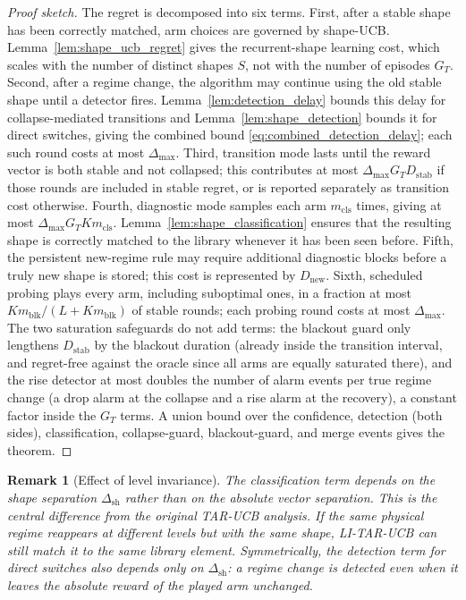 \documentclass[11pt]{article}
\newtheorem{remark}{Remark}
\begin{document}
\begin{proof}[Proof sketch]
The regret is decomposed into six terms. First, after a stable shape has been correctly matched, arm choices are governed by shape-UCB. Lemma~\ref{lem:shape_ucb_regret} gives the recurrent-shape learning cost, which scales with the number of distinct shapes $S$, not with the number of episodes $G_T$. Second, after a regime change, the algorithm may continue using the old stable shape until a detector fires. Lemma~\ref{lem:detection_delay} bounds this delay for collapse-mediated transitions and Lemma~\ref{lem:shape_detection} bounds it for direct switches, giving the combined bound \eqref{eq:combined_detection_delay}; each such round costs at most $\Delta_{\max}$. Third, transition mode lasts until the reward vector is both stable and not collapsed; this contributes at most $\Delta_{\max}G_TD_{\mathrm{stab}}$ if those rounds are included in stable regret, or is reported separately as transition cost otherwise. Fourth, diagnostic mode samples each arm $m_{\mathrm{cls}}$ times, giving at most $\Delta_{\max}G_TK m_{\mathrm{cls}}$. Lemma~\ref{lem:shape_classification} ensures that the resulting shape is correctly matched to the library whenever it has been seen before. Fifth, the persistent new-regime rule may require additional diagnostic blocks before a truly new shape is stored; this cost is represented by $D_{\mathrm{new}}$. Sixth, scheduled probing plays every arm, including suboptimal ones, in a fraction at most $Km_{\mathrm{blk}}/(L+Km_{\mathrm{blk}})$ of stable rounds; each probing round costs at most $\Delta_{\max}$. The two saturation safeguards do not add terms: the blackout guard only lengthens $D_{\mathrm{stab}}$ by the blackout duration (already inside the transition interval, and regret-free against the oracle since all arms are equally saturated there), and the rise detector at most doubles the number of alarm events per true regime change (a drop alarm at the collapse and a rise alarm at the recovery), a constant factor inside the $G_T$ terms. A union bound over the confidence, detection (both sides), classification, collapse-guard, blackout-guard, and merge events gives the theorem.
\end{proof}

\begin{remark}[Effect of level invariance]
The classification term depends on the shape separation $\Delta_{\mathrm{sh}}$ rather than on the absolute vector separation. This is the central difference from the original TAR-UCB analysis. If the same physical regime reappears at different levels but with the same shape, LI-TAR-UCB can still match it to the same library element. Symmetrically, the detection term for direct switches also depends only on $\Delta_{\mathrm{sh}}$: a regime change is detected even when it leaves the absolute reward of the played arm unchanged.
\end{remark}
\end{document}
